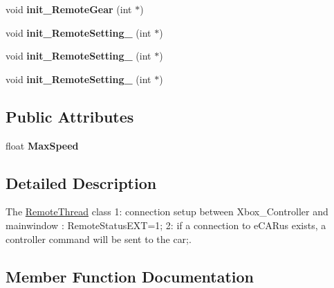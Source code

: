 \begin{DoxyCompactItemize}
\item 
\hypertarget{class_remote_thread_aca0c6a9df3fb70119fb2bd4a7e40f8af}{}void {\bfseries init\+\_\+\+Remote\+Gear} (int $\ast$)\label{class_remote_thread_aca0c6a9df3fb70119fb2bd4a7e40f8af}

\item 
\hypertarget{class_remote_thread_ab926c7f3a9ba29a1df52993a1747c128}{}void {\bfseries init\+\_\+\+Remote\+Setting\+\_} (int $\ast$)\label{class_remote_thread_ab926c7f3a9ba29a1df52993a1747c128}

\item 
\hypertarget{class_remote_thread_ad0362858a88dc58310be1171d22239c0}{}void {\bfseries init\+\_\+\+Remote\+Setting\+\_} (int $\ast$)\label{class_remote_thread_ad0362858a88dc58310be1171d22239c0}

\item 
\hypertarget{class_remote_thread_a37156a23aea69e77fd86cf97599afd08}{}void {\bfseries init\+\_\+\+Remote\+Setting\+\_} (int $\ast$)\label{class_remote_thread_a37156a23aea69e77fd86cf97599afd08}

\end{DoxyCompactItemize}
\subsection*{Public Attributes}
\begin{DoxyCompactItemize}
\item 
\hypertarget{class_remote_thread_a668f3195a6b2fd7f7881398ad8c0537f}{}float {\bfseries Max\+Speed}\label{class_remote_thread_a668f3195a6b2fd7f7881398ad8c0537f}

\end{DoxyCompactItemize}


\subsection{Detailed Description}
The \hyperlink{class_remote_thread}{Remote\+Thread} class 1\+: connection setup between Xbox\+\_\+\+Controller and mainwindow \+: Remote\+Status\+E\+X\+T=1; 2\+: if a connection to e\+C\+A\+Rus exists, a controller command will be sent to the car;. 

\subsection{Member Function Documentation}
\hypertarget{class_remote_thread_afaaf517a8ecef88feeaa477ac84da127}{}
